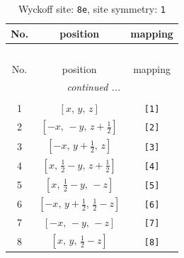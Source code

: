 \documentclass[fleqn,8pt]{jsarticle}
\begin{document}
\renewcommand{\arraystretch}{1.2}
\begin{longtable}{ccc}
\caption{Wyckoff site: {\tt 8e}, site symmetry: {\tt 1}}
 \\
 \hline \hline
No. & position & mapping \\ \hline \endfirsthead

\multicolumn{2}{l}{\tablename\ \thetable{}} \\
 \hline \hline
No. & position & mapping \\ \hline \endhead

 \hline \hline
\multicolumn{2}{r}{\footnotesize\it continued ...} \\ \endfoot

 \hline \hline
\multicolumn{2}{r}{} \\ \endlastfoot

1 & $\left[ x,\, y,\, z \right]$ & {\tt [1]} \\ \hline
2 & $\left[ - x,\, - y,\, z + \frac{1}{2} \right]$ & {\tt [2]} \\ \hline
3 & $\left[ - x,\, y + \frac{1}{2},\, z \right]$ & {\tt [3]} \\ \hline
4 & $\left[ x,\, \frac{1}{2} - y,\, z + \frac{1}{2} \right]$ & {\tt [4]} \\ \hline
5 & $\left[ x,\, \frac{1}{2} - y,\, - z \right]$ & {\tt [5]} \\ \hline
6 & $\left[ - x,\, y + \frac{1}{2},\, \frac{1}{2} - z \right]$ & {\tt [6]} \\ \hline
7 & $\left[ - x,\, - y,\, - z \right]$ & {\tt [7]} \\ \hline
8 & $\left[ x,\, y,\, \frac{1}{2} - z \right]$ & {\tt [8]} \\
\end{longtable}
\end{document}
